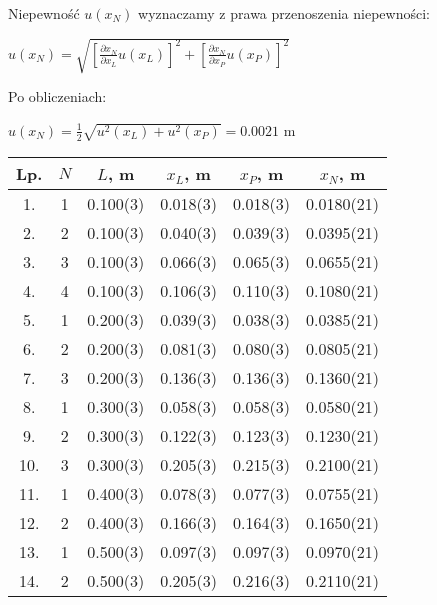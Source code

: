 \documentclass[12pt]{article}
\begin{document}
Niepewność $u(x_N)$ wyznaczamy z prawa przenoszenia niepewności:
\begin{center}
    $u(x_N) = \sqrt{[\frac{\partial x_N}{\partial x_L}u(x_L)]^2 + [\frac{\partial x_N}{\partial x_P}u(x_P)]^2}$ \\
\end{center}

Po obliczeniach:
\begin{center}
    $u(x_N) = \frac{1}{2}\sqrt{u^2(x_L) + u^2(x_P)} = 0.0021$ m
\end{center}

\begin{center}
    \begin{tabular} { | c | c | c | c | c | c | }
        \hline
        Lp. & $N$ & $L$, m   & $x_L$, m & $x_P$, m & $x_N$, m   \\
        \hline
        1.  & 1   & 0.100(3) & 0.018(3) & 0.018(3) & 0.0180(21) \\ \hline
        2.  & 2   & 0.100(3) & 0.040(3) & 0.039(3) & 0.0395(21) \\ \hline
        3.  & 3   & 0.100(3) & 0.066(3) & 0.065(3) & 0.0655(21) \\ \hline
        4.  & 4   & 0.100(3) & 0.106(3) & 0.110(3) & 0.1080(21) \\ \hline
        5.  & 1   & 0.200(3) & 0.039(3) & 0.038(3) & 0.0385(21) \\ \hline
        6.  & 2   & 0.200(3) & 0.081(3) & 0.080(3) & 0.0805(21) \\ \hline
        7.  & 3   & 0.200(3) & 0.136(3) & 0.136(3) & 0.1360(21) \\ \hline
        8.  & 1   & 0.300(3) & 0.058(3) & 0.058(3) & 0.0580(21) \\ \hline
        9.  & 2   & 0.300(3) & 0.122(3) & 0.123(3) & 0.1230(21) \\ \hline
        10. & 3   & 0.300(3) & 0.205(3) & 0.215(3) & 0.2100(21) \\ \hline
        11. & 1   & 0.400(3) & 0.078(3) & 0.077(3) & 0.0755(21) \\ \hline
        12. & 2   & 0.400(3) & 0.166(3) & 0.164(3) & 0.1650(21) \\ \hline
        13. & 1   & 0.500(3) & 0.097(3) & 0.097(3) & 0.0970(21) \\ \hline
        14. & 2   & 0.500(3) & 0.205(3) & 0.216(3) & 0.2110(21) \\
        \hline
    \end{tabular}
\end{center}
\end{document}
